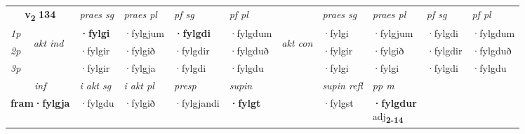 \noindent
\begin{tabular}{lllllllllll} \toprule
\multicolumn{2}{c}{\textbf{v{\textsubscript{2}}} \Large{\textbf{134}}}  &  \textit{praes sg}  & \textit{praes pl}  &\textit{ pf sg} & \textit{pf pl} &  &  \textit{praes sg}  & \textit{praes pl}  & \textit{pf sg} & \textit{pf pl } \\*
	\cmidrule{3-6} \cmidrule{8-11}
 {\textit{1p}} & \multirow{3}{*}{\begin{turn}{90}\textit{akt ind}\end{turn}} & \textbf{·fylgi} & ·fylgjum & \textbf{·fylgdi} & ·fylgdum & \multirow{3}{*}{\begin{turn}{90}\textit{akt con}\end{turn}} &·fylgi & ·fylgjum & ·fylgdi & ·fylgdum\\*
 {\textit{2p}} &  &  ·fylgir  & ·fylgið & ·fylgdir & ·fylgduð & & ·fylgir & ·fylgið & ·fylgdir & ·fylgduð \\*
{\textit{3p}} &  & ·fylgir & ·fylgja & ·fylgdi & ·fylgdu & & ·fylgi & ·fylgi& ·fylgdi & ·fylgdu \\*
\cmidrule{3-6} \cmidrule{8-11}

   \multicolumn{2}{c}{\textit{inf}}  & \textit{i akt sg} & \textit{i akt pl}   & \textit{presp} & \textit{supin} && \textit{supin refl} & \textit{pp m} \\*
  \multicolumn{2}{c}{\textbf{fram\allowbreak ·fylgja}} & ·fylgdu  & ·fylgið   & ·fylgjandi &  \textbf{·fylgt} && ·fylgst & \specialcell{\textbf{·fylgdur} \\ adj\textbf{\textsubscript{2-14}}} \\*
\end{tabular}

